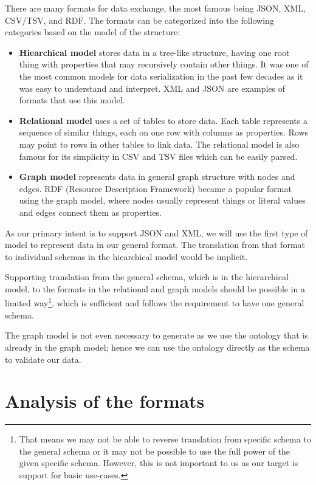There are many formats for data exchange, the most famous being JSON, XML, CSV/TSV, and RDF. The formats can be categorized into the following categories based on the model of the structure:
\begin{itemize}
    \item \textbf{Hiearchical model} stores data in a tree-like structure, having one root thing with properties that may recursively contain other things. It was one of the most common models for data serialization in the past few decades as it was easy to understand and interpret. XML and JSON are examples of formats that use this model.
    \item \textbf{Relational model} uses a set of tables to store data. Each table represents a sequence of similar things, each on one row with columns as properties. Rows may point to rows in other tables to link data. The relational model is also famous for its simplicity in CSV and TSV files which can be easily parsed.
    \item \textbf{Graph model} represents data in general graph structure with nodes and edges. RDF (Resource Description Framework) became a popular format using the graph model, where nodes usually represent things or literal values and edges connect them as properties.
\end{itemize}

As our primary intent is to support JSON and XML, we will use the first type of model to represent data in our general format. The translation from that format to individual schemas in the hiearchical model would be implicit.

Supporting translation from the general schema, which is in the hierarchical model, to the formats in the relational and graph models should be possible in a limited way\footnote{That means we may not be able to reverse translation from specific schema to the general schema or it may not be possible to use the full power of the given specific schema. However, this is not important to us as our target is support for basic use-cases.}, which is sufficient and follows the requirement to have one general schema.

The graph model is not even necessary to generate as we use the ontology that is already in the graph model; hence we can use the ontology directly as the schema to validate our data.


\section*{Analysis of the formats}

